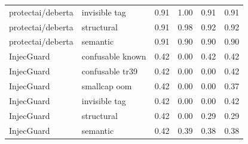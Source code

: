 \begin{table}[ht]
\begin{tabular}{ll cccc}
protectai/deberta & invisible tag & 0.91 & 1.00 & 0.91 & 0.91 \\
protectai/deberta & structural & 0.91 & 0.98 & 0.92 & 0.92 \\
protectai/deberta & semantic & 0.91 & 0.90 & 0.90 & 0.90 \\
InjecGuard & confusable known & 0.42 & 0.00 & 0.42 & 0.42 \\
InjecGuard & confusable tr39 & 0.42 & 0.00 & 0.00 & 0.42 \\
InjecGuard & smallcap oom & 0.42 & 0.00 & 0.00 & 0.37 \\
InjecGuard & invisible tag & 0.42 & 0.00 & 0.00 & 0.42 \\
InjecGuard & structural & 0.42 & 0.00 & 0.29 & 0.29 \\
InjecGuard & semantic & 0.42 & 0.39 & 0.38 & 0.38 \\
\bottomrule
\end{tabular}
\end{table}